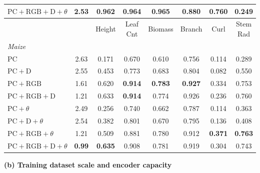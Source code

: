 \documentclass[10pt,twocolumn,letterpaper]{article}
\begin{document}
\begin{table}[t]
\begin{minipage}[t]{0.52\textwidth}
{\begin{tabular}{l c cccccc}
    $\mathrm{PC}+\mathrm{RGB}+\mathrm{D}+\theta$ & 2.53 & 0.962 & 0.964 & 0.965 & 0.880 & 0.760 & 0.249 \\
    \midrule
    & & Height & Leaf Cnt & Biomass & Branch & Curl & Stem Rad \\
    \multicolumn{8}{l}{\emph{Maize}} \\
    PC & 2.63 & 0.171 & 0.670 & 0.610 & 0.756 & 0.114 & 0.289 \\
    $\mathrm{PC}+\mathrm{D}$ & 2.55 & 0.453 & 0.773 & 0.683 & 0.804 & 0.082 & 0.550 \\
    $\mathrm{PC}+\mathrm{RGB}$ & 1.61 & 0.620 & \textbf{0.914} & \textbf{0.783} & \textbf{0.927} & 0.334 & 0.753 \\
    $\mathrm{PC}+\mathrm{RGB}+\mathrm{D}$ & 1.21 & 0.633 & \textbf{0.914} & 0.774 & 0.926 & 0.236 & 0.760 \\
    $\mathrm{PC}+\theta$ & 2.49 & 0.256 & 0.740 & 0.662 & 0.787 & 0.114 & 0.363 \\
    $\mathrm{PC}+\mathrm{D}+\theta$ & 2.54 & 0.382 & 0.801 & 0.670 & 0.795 & 0.136 & 0.408 \\
    $\mathrm{PC}+\mathrm{RGB}+\theta$ & 1.21 & 0.509 & 0.881 & 0.780 & 0.912 & \textbf{0.371} & \textbf{0.763} \\
    $\mathrm{PC}+\mathrm{RGB}+\mathrm{D}+\theta$ & \textbf{0.99} & \textbf{0.635} & 0.908 & 0.781 & 0.919 & 0.304 & 0.743 \\
    \bottomrule
  \end{tabular}}
  \end{minipage}\hfill
  \begin{minipage}[t]{0.45\textwidth}
    \centering
    \textbf{(b) Training dataset scale and encoder capacity}\\[3pt]
    \setlength{\tabcolsep}{3.0pt}
\end{minipage}
\end{table}
\end{document}
